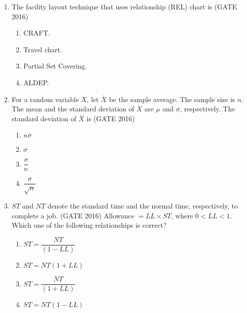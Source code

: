\documentclass[journal,12pt,onecolumn]{IEEEtran}
\theoremstyle{remark}
\begin{document}
\begin{enumerate}
\item The facility layout technique that uses relationship (REL) chart is  \hfill{(GATE 2016)}

\begin{multicols}{2}
\begin{enumerate}
    \item CRAFT.
    \item Travel chart.
    \item Partial Set Covering.
    \item ALDEP.
\end{enumerate}
\end{multicols}

\vspace{0.5cm}

\item For a random variable $X$, let $\bar{X}$ be the sample average. The sample size is $n$. 
The mean and the standard deviation of $X$ are $\mu$ and $\sigma$, respectively. 
The standard deviation of $\bar{X}$ is  \hfill{(GATE 2016)}

\begin{multicols}{2}
\begin{enumerate}
    \item $n\sigma$
    \item $\sigma$
    \item $\dfrac{\sigma}{n}$
    \item $\dfrac{\sigma}{\sqrt{n}}$
\end{enumerate}
\end{multicols}

\vspace{0.5cm}

\item $ST$ and $NT$ denote the standard time and the normal time, respectively, to complete a job.  \hfill{(GATE 2016)}
Allowance $= LL \times ST$, where $0 < LL < 1$. Which one of the following relationships is correct?  

\begin{multicols}{2}
\begin{enumerate}
    \item $ST = \dfrac{NT}{(1 - LL)}$
    \item $ST = NT (1 + LL)$
    \item $ST = \dfrac{NT}{(1 + LL)}$
    \item $ST = NT (1 - LL)$
\end{enumerate}
\end{multicols}


\end{enumerate}
\end{document}
